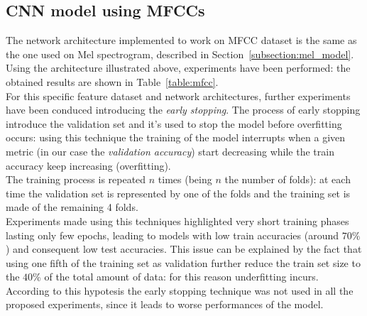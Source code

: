 \documentclass[oneside,openany]{article}
\begin{document}
    \subsection{CNN model using MFCCs}
    \label{subsection:mfcc_model}
    The network architecture implemented to work on MFCC dataset is the same as the one used on Mel spectrogram, described in Section~\ref{subsection:mel_model}. 
    Using the architecture illustrated above, experiments have been performed: the obtained results are shown in Table~\ref{table:mfcc}. \\
    For this specific feature dataset and network architectures, further experiments have been conduced introducing the \textit{early stopping}. The process of early stopping introduce the validation set and it's used to stop the model before overfitting occurs: using this technique the training of the model interrupts when a given metric (in our case the \textit{validation accuracy}) start decreasing while the train accuracy keep increasing (overfitting).\\
    The training process is repeated $n$ times (being $n$ the number of folds): at each time the validation set is represented by one of the folds and the training set is made of the remaining 4 folds. \\
    Experiments made using this techniques highlighted very short training phases lasting only few epochs, leading to models with low train accuracies (around $70\%$) and consequent low test accuracies. This issue can be explained by the fact that using one fifth of the training set as validation further reduce the train set size to the $40$\% of the total amount of data: for this reason underfitting incurs.
    According to this hypotesis the early stopping technique was not used in all the proposed experiments, since it leads to worse performances of the model.
    
\end{document}
